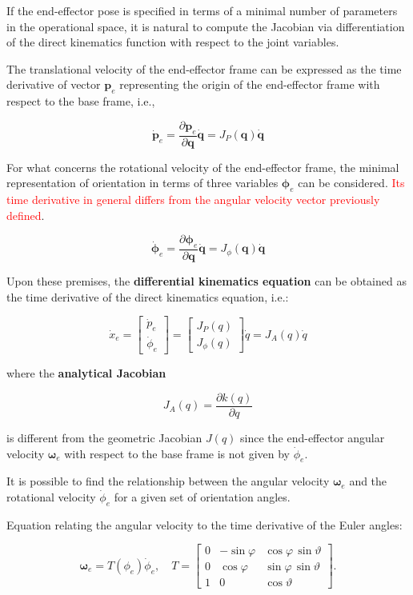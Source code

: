 If the end-effector pose is specified in terms of a minimal number of parameters in the operational space, it is natural to compute the Jacobian via differentiation of the direct kinematics function with respect to the joint variables.

The translational velocity of the end-effector frame can be expressed as the time derivative of vector $\mathbf{p}_e$ representing the origin of the end-effector frame with respect to the base frame, i.e.,
    
\[
    \dot{\mathbf{p}}_e = \frac{\partial \mathbf{p}_e}{\partial \mathbf{q}} \dot{\mathbf{q}} = J_P(\mathbf{q}) \dot{\mathbf{q}}
\]

For what concerns the rotational velocity of the end-effector frame, the minimal representation of orientation in terms of three variables $\boldsymbol{\phi}_e$ can be considered. \textcolor{red}{Its time derivative in general differs from the angular velocity vector previously defined}.

\[
    \dot{\boldsymbol{\phi}}_e = \frac{\partial \boldsymbol{\phi}_e}{\partial \mathbf{q}} \dot{\mathbf{q}} = J_{\phi}(\mathbf{q}) \dot{\mathbf{q}}
\]

Upon these premises, the \textbf{differential kinematics equation} can be obtained as the time derivative of the direct kinematics equation, i.e.:

\[
\dot{x}_e =
\begin{bmatrix}
\dot{p}_e \\
\dot{\phi}_e
\end{bmatrix}
=
\begin{bmatrix}
J_P(q) \\
J_\phi(q)
\end{bmatrix}
\dot{q}
= J_A(q)\dot{q}
\]

where the \textbf{analytical Jacobian}

\[
J_A(q) = \frac{\partial k(q)}{\partial q}
\]

is different from the geometric Jacobian $J(q)$ since the end-effector angular velocity $\boldsymbol{\omega}_e$ with respect to the base frame is not given by $\dot{\phi}_e$.

It is possible to find the relationship between the angular velocity $\boldsymbol{\omega}_e$ and the rotational velocity $\dot{\phi}_e$ for a given set of orientation angles.

Equation relating the angular velocity to the time derivative of the Euler angles:

\[
\boldsymbol{\omega}_e = T(\phi_e)\dot{\phi}_e, \quad
T =
\begin{bmatrix}
0 & -\sin \varphi & \cos \varphi \, \sin \vartheta \\
0 & \cos \varphi & \sin \varphi \, \sin \vartheta \\
1 & 0 & \cos \vartheta
\end{bmatrix}.
\]

